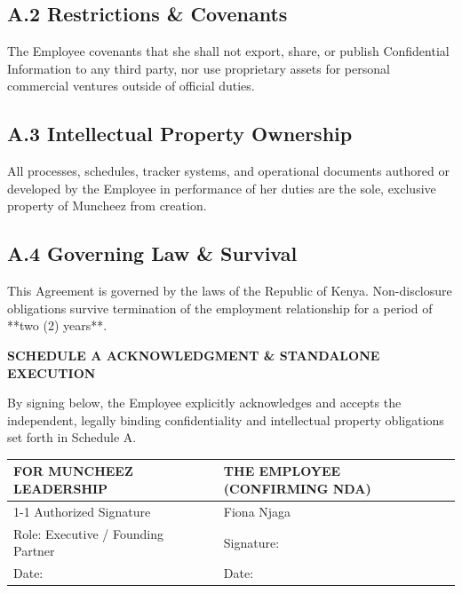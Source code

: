 \documentclass[11pt,a4paper]{article}
\begin{document}
\subsection*{A.2 Restrictions \& Covenants}
The Employee covenants that she shall not export, share, or publish Confidential Information to any third party, nor use proprietary assets for personal commercial ventures outside of official duties.

\subsection*{A.3 Intellectual Property Ownership}
All processes, schedules, tracker systems, and operational documents authored or developed by the Employee in performance of her duties are the sole, exclusive property of Muncheez from creation.

\subsection*{A.4 Governing Law \& Survival}
This Agreement is governed by the laws of the Republic of Kenya. Non-disclosure obligations survive termination of the employment relationship for a period of **two (2) years**.

\vspace{2.0cm}

\textbf{\textsf{\small SCHEDULE A ACKNOWLEDGMENT \& STANDALONE EXECUTION}}

By signing below, the Employee explicitly acknowledges and accepts the independent, legally binding confidentiality and intellectual property obligations set forth in Schedule A.

\vspace{1.2cm}

\begin{tabularx}{\textwidth}{@{}X p{1.2cm} X@{}}
    \textbf{FOR MUNCHEEZ LEADERSHIP} & & \textbf{THE EMPLOYEE (CONFIRMING NDA)} \\[1.0cm]
    \cline{1-1} \cline{3-3}
    \vspace{0.1cm}
    \textsf{\small Authorized Signature} & & \textsf{\small Fiona Njaga} \\
    \textsf{\scriptsize Role: Executive / Founding Partner} & & \textsf{\scriptsize Signature: \underline{\hspace{3.5cm}}} \\
    \textsf{\scriptsize Date: \underline{\hspace{3.0cm}}} & & \textsf{\scriptsize Date: \underline{\hspace{3.0cm}}}
\end{tabularx}
\end{document}
